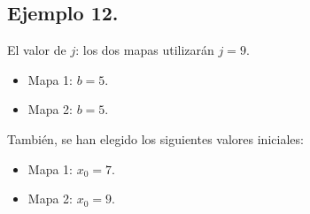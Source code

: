 \documentclass[10pt]{IEEEtran}
\begin{document}
\subsection{Ejemplo 12.}
El valor de $j$: los dos mapas utilizarán $j=9$. 

\begin{itemize}
\item Mapa 1: $b =  5$.
\item Mapa 2: $b =  5$.
\end{itemize}

También, se han elegido los siguientes valores iniciales:

\begin{itemize}
\item Mapa 1: $x_{0} = 7$.
\item Mapa 2: $x_{0} = 9$.
\end{itemize}
\end{document}
